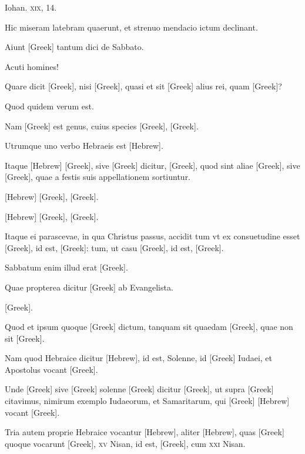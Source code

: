 \begin{parnumbers}
Iohan. \textsc{xix}, 14.

Hic miseram latebram quaerunt,
et strenuo mendacio ictum declinant.

Aiunt \textgreek{[Greek]} tantum
dici de Sabbato.

Acuti homines!

Quare dicit \textgreek{[Greek]},
nisi \textgreek{[Greek]}, quasi et sit \textgreek{[Greek]}
 alius rei, quam \textgreek{[Greek]}?
 
Quod quidem verum est.

Nam \textgreek{[Greek]} est genus, cuius species
\textgreek{[Greek]}, \textgreek{[Greek]}.

Utrumque uno verbo Hebraeis est
\texthebrew{[Hebrew]}.

Itaque \texthebrew{[Hebrew]} \textgreek{[Greek]},
 sive \textgreek{[Greek]} dicitur,
\textgreek{[Greek]}, quod sint aliae \textgreek{[Greek]},
 sive \textgreek{[Greek]}, quae a festis
suis appellationem sortiuntur.

\texthebrew{[Hebrew]} \textgreek{[Greek]}, \textgreek{[Greek]}.

\texthebrew{[Hebrew]} \textgreek{[Greek]}, \textgreek{[Greek]}.

Itaque ei parascevae, in qua Christus passus, accidit tum
vt ex consuetudine esset \textgreek{[Greek]}, id est, \textgreek{[Greek]}:
tum, ut casu \textgreek{[Greek]}, id est, \textgreek{[Greek]}.

Sabbatum enim
illud erat \textgreek{[Greek]}.

Quae propterea dicitur \textgreek{[Greek]}
ab Evangelista.

\textgreek{[Greek]}.

Quod
et ipsum quoque \textgreek{[Greek]} dictum, tanquam sit quaedam
 \textgreek{[Greek]},
quae non sit \textgreek{[Greek]}.

Nam quod Hebraice dicitur \texthebrew{[Hebrew]},
id est, Solenne, id \textgreek{[Greek]} Iudaei, et Apostolus vocant
 \textgreek{[Greek]}.

Unde \textgreek{[Greek]} sive \textgreek{[Greek]} solenne \textgreek{[Greek]}
dicitur \textgreek{[Greek]}, ut supra \textgreek{[Greek]} citavimus, nimirum
exemplo Iudaeorum, et Samaritarum, qui \textgreek{[Greek]}
\texthebrew{[Hebrew]} vocant \textgreek{[Greek]}.

Tria autem proprie Hebraice vocantur \texthebrew{[Hebrew]},
aliter \texthebrew{[Hebrew]}, quas \textgreek{[Greek]} quoque vocarunt
 \textgreek{[Greek]}, \textsc{xv} Nisan, id est, \textgreek{[Greek]},
 cum \textsc{xxi} Nisan.


\end{parnumbers}
